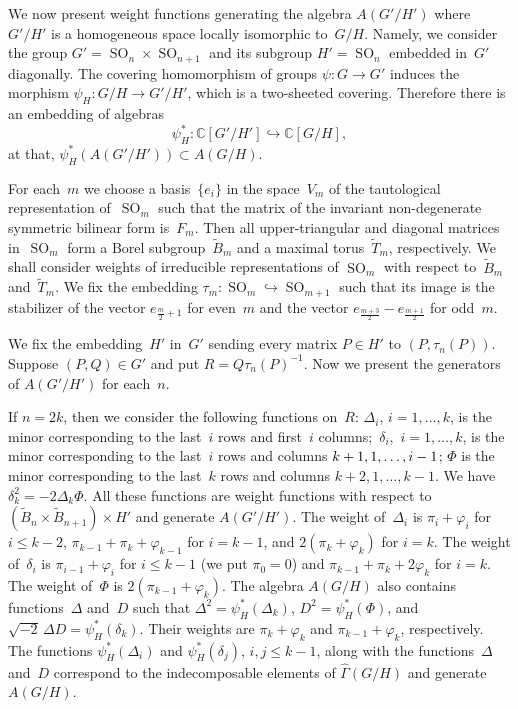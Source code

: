 \documentclass[12pt]{amsart}
\theoremstyle{definition}
\theoremstyle{remark}
\begin{document}
We now present weight functions generating the algebra $A(G'/H')$
where $G'/H'$ is a homogeneous space locally isomorphic to~$G/H$.
Namely, we consider the group $G'={\operatorname{SO}}_n\times{\operatorname{SO}}_{n+1}$ and its
subgroup $H'={\operatorname{SO}}_n$ embedded in~$G'$ diagonally. The covering
homomorphism of groups $\psi\colon G\to G'$ induces the morphism
$\psi_H\colon G/H\to G'/H'$, which is a two-sheeted covering.
Therefore there is an embedding of algebras
$$
\psi_H^*\colon \mathbb{C}[G'/H']\hookrightarrow \mathbb{C}[G/H],
$$
at that, $\psi_H^*(A(G'/H'))\subset A(G/H)$.

For each~$m$ we choose a basis~$\{e_i\}$ in the space~$V_m$ of the
tautological representation of~${\operatorname{SO}}_m$ such that the matrix of the
invariant non-degenerate symmetric bilinear form is~$F_m$. Then all
upper-triangular and diagonal matrices in~${\operatorname{SO}}_m$ form a Borel
subgroup~$\widetilde B_m$ and a maximal torus~$\widetilde T_m$,
respectively. We shall consider weights of irreducible
representations of ${\operatorname{SO}}_m$ with respect to~$\widetilde B_m$
and~$\widetilde T_m$. We fix the embedding $\tau_m\colon {\operatorname{SO}}_m
\hookrightarrow {\operatorname{SO}}_{m+1}$ such that its image is the stabilizer of
the vector $e_{\frac{m}2+1}$ for even~$m$ and the vector
$e_{\frac{m+3}2}-e_{\frac{m+1}2}$ for odd~$m$.

We fix the embedding~$H'$ in~$G'$ sending every matrix $P\in H'$ to
$(P,\tau_n(P))$. Suppose $(P,Q)\in G'$ and put $R=Q\tau_n(P)^{-1}$.
Now we present the generators of $A(G'/H')$ for each~$n$.

If $n=2k$, then we consider the following functions on~$R$:
$\Delta_i$, $i=1,\dots,k$, is the minor corresponding to the
last~$i$ rows and first~$i$ columns;~$\delta_i$,~$i=1,\dots,k$, is
the minor corresponding to the last~$i$ rows and columns
$k+\nobreak1,1,\dots,i-1$; $\Phi$ is the minor corresponding to the
last~$k$ rows and columns $k+2,1,\dots,k-1$. We have
$\delta_k^2=-2\Delta_k\Phi$. All these functions are weight
functions with respect to $(\widetilde B_n\times \widetilde
B_{n+1})\times H'$ and generate $A(G'/H')$. The weight of~$\Delta_i$
is $\pi_i+\varphi_i$ for $i{\leqslant} k-2$, $\pi_{k-1}+\pi_k+\varphi_{k-1}$
for $i=k-1$, and $2(\pi_k+\varphi_k)$ for $i=k$. The weight
of~$\delta_i$ is $\pi_{i-1}+\varphi_i$ for $i{\leqslant} k-1$ (we put
$\pi_0=0$) and $\pi_{k-1}+\pi_k+2\varphi_k$ for $i=k$. The weight
of~$\Phi$ is $2(\pi_{k-1}+\varphi_k)$. The algebra $A(G/H)$ also
contains functions~$\Delta$ and~$D$ such that $\Delta^2
=\psi_H^*(\Delta_k)$, $D^2=\psi_H^*(\Phi)$, and $\sqrt{-2}\,\Delta
D=\psi_H^*(\delta_k)$. Their weights are $\pi_k+\varphi_k$ and
$\pi_{k-1}+\varphi_k$, respectively. The functions
$\psi_H^*(\Delta_i)$ and $\psi_H^*(\delta_j)$, $i,j{\leqslant} k-1$, along
with the functions~$\Delta$ and~$D$ correspond to the indecomposable
elements of $\widehat\Gamma(G/H)$ and generate~$A(G/H)$.
\end{document}
